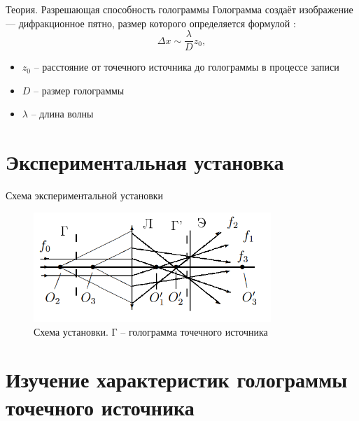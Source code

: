 \documentclass[11pt]{beamer} %
\begin{document}
   \begin{frame}{Теория. Разрешающая способность голограммы}
        Голограмма создаёт изображение — дифракционное пятно, размер которого определяется формулой \cite{lab}:
        \begin{equation}
            \Delta x \sim \frac{\lambda}{D} z_0,
        \end{equation}
        \begin{itemize}
            \item $z_0$ -- расстояние от точечного источника до голограммы в процессе записи
            \item $D$ -- размер голограммы
            \item $\lambda$ -- длина волны
        \end{itemize}
       
   \end{frame}
    
    \section{Экспериментальная установка}

    \begin{frame}{Схема экспериментальной установки}
    \small
    \begin{figure}[H]
        \centering
        \includegraphics[width = 0.8\textwidth]{images/installation.png}
        \caption{Схема установки. Г -- голограмма точечного источника}
        \label{fig:installation_1}
    \end{figure}
    \end{frame}

    \section{Изучение характеристик голограммы точечного источника}
\end{document}
